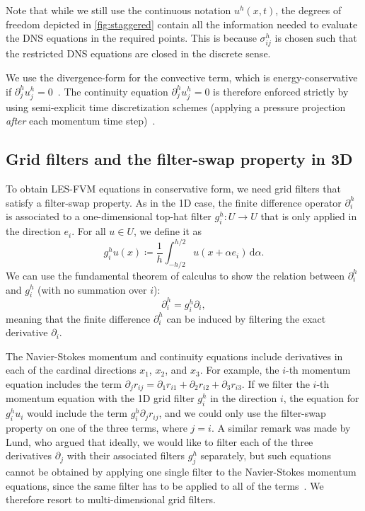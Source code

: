 \documentclass[preprint,twocolumn,5p]{elsarticle}
\begin{document}
Note that while we still use the continuous notation $u^h(x, t)$, the degrees of
freedom depicted in \cref{fig:staggered} contain all the information needed to
evaluate the DNS equations in the required points. This is because $\sigma^h_{i j}$
is chosen such that the restricted DNS equations are closed in the discrete sense.

We use the divergence-form for the convective term, which is energy-conservative if
$\partial^h_j u^h_j = 0$~\cite{morinishiFullyConservativeHigher1998}.
The continuity equation $\partial^h_j u^h_j = 0$ is therefore enforced strictly
by using semi-explicit time discretization schemes
(applying a pressure projection \emph{after} each momentum time
step)~\cite{hairerNumericalSolutionDifferentialAlgebraic1989,
sanderseEnergyconservingRungeKutta2013}.

\subsection{Grid filters and the filter-swap property in 3D}

To obtain LES-FVM equations in conservative form, we need grid
filters that satisfy a filter-swap property.
As in the 1D case, the finite difference operator $\partial^h_i$ is associated
to a one-dimensional top-hat filter $g^h_i : U \to U$ 
that is only applied in the direction $e_i$. For all $u \in U$, we define it as
\begin{equation} \label{ns-gh}
    g^h_i u(x) \coloneq
    \frac{1}{h} \int_{-h / 2}^{h / 2} u(x + \alpha e_i) \, \mathrm{d} \alpha.
\end{equation}
We can use the fundamental theorem of calculus to show the
relation between $\partial^h_i$ and $g^h_i$
(with no summation over $i$):
\begin{equation} \label{eq:divergencetheorem}
    \partial^h_i = g^h_i \partial_i,
\end{equation}
meaning that the finite difference $\partial^h_i$
can be induced by filtering the exact derivative $\partial_i$.

The Navier-Stokes momentum and continuity equations include derivatives in
each of the cardinal directions $x_1$, $x_2$, and $x_3$. For example, the $i$-th
momentum equation includes the term
$\partial_j r_{i j} = \partial_1 r_{i 1} + \partial_2 r_{i 2} + \partial_3 r_{i 3}$.
If we filter the $i$-th momentum equation with the 1D grid filter $g^h_i$ in the
direction $i$, the equation for $g^h_i u_i$ would include the term
$g^h_i \partial_j r_{i j}$, and we could only use the filter-swap property
on one of the three terms, where $j = i$. A similar remark was made by
Lund, who argued that ideally, we would like
to filter each of the three derivatives $\partial_j$ with their associated
filters $g^h_j$ separately, but
such equations cannot be obtained by applying one single filter to
the Navier-Stokes momentum equations, since the same filter has to be applied to
all of the terms~\cite{lundUseExplicitFilters2003}.
We therefore resort to multi-dimensional grid filters.
\end{document}

